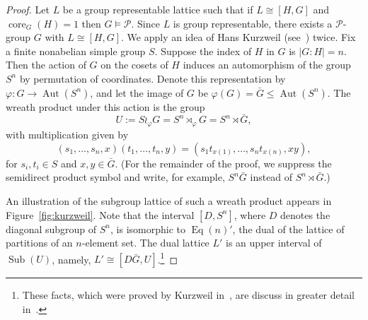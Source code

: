 \documentclass[11pt]{amsart}
\theoremstyle{plain}
\theoremstyle{definition}
\theoremstyle{remark}
\numberwithin{theorem}{section}
\numberwithin{claim}{section}
\numberwithin{equation}{section}
\numberwithin{conjecture}{section}
\newcommand{\<}{\ensuremath{\langle}}
\renewcommand{\>}{\ensuremath{\rangle}}
\renewcommand{\leq}{\ensuremath{\leqslant}}
\newcommand{\Aut}{\ensuremath{\operatorname{Aut}}}
\newcommand{\Eq}{\ensuremath{\operatorname{Eq}}}
\newcommand{\Sub}{\ensuremath{\operatorname{Sub}}}
\newcommand{\core}{\ensuremath{\operatorname{core}}}
\newcommand{\0}{\ensuremath{\mathbf{0}}}
\newcommand{\1}{\ensuremath{\mathbf{1}}}
\newcommand{\2}{\ensuremath{\mathbf{2}}}
\newcommand{\3}{\ensuremath{\mathbf{3}}}
\newcommand{\4}{\ensuremath{\mathbf{4}}}
\newcommand{\5}{\ensuremath{\mathbf{5}}}
\newcommand{\cP}{\ensuremath{\mathcal{P}}}
\renewcommand{\phi}{\ensuremath{\varphi}}
\begin{document}
\begin{proof}
  Let $L$ be a group representable lattice such that if $L\cong [H,G]$ and
  $\core_G(H)=1$ then $G\vDash \cP$.
  Since $L$ is group representable, there exists a $\cP$-group $G$ with $L
  \cong [H,G]$. 
  We apply an idea of Hans Kurzweil (see~\cite{Kurzweil:1985}) twice.
Fix a finite nonabelian simple
  group $S$. Suppose the index of $H$ in $G$ is $|G:H| = n$.
  Then the action of $G$ on the cosets of $H$ induces an automorphism of the
  group $S^n$ by permutation of coordinates.  Denote this representation by
  $\phi: G \rightarrow \Aut(S^n)$, 
  and let the image of $G$ be $\phi(G) =
  \bar{G} \leq \Aut(S^n)$.  
  The wreath product under this action is the group
  \[
  U:= S\wr_\phi G = S^n \rtimes_\phi G = S^n \rtimes \bar{G}, %
  \]
  with multiplication given by
  \[
  (s_1, \dots, s_n, x) (t_1, \dots, t_n, y) = 
  (s_1 t_{x(1)}, \dots, s_nt_{x(n)}, x y),
  \]
  for $s_i, t_i \in S$ and $x, y \in \bar{G}$.  (For the remainder of the proof,
  we suppress the semidirect product symbol and write, for example, $S^n\bar{G}$
  instead of $S^n \rtimes \bar{G}$.)

  An illustration of the subgroup lattice of such a wreath product appears in
  Figure~\ref{fig:kurzweil}.  Note that the interval
  $[D, S^n]$, where $D$ denotes the diagonal subgroup of
  $S^n$, is isomorphic to $\Eq(n)'$, the dual of the lattice of partitions of an
  $n$-element set.
  The dual lattice $L'$ is an upper interval of $\Sub(U)$, namely,
  $L'\cong [D\bar{G}, U]$.\footnote{These facts, which were proved by Kurzweil
    in~\cite{Kurzweil:1985}, are discuss in greater detail in~\cite[Section 2.2]{DeMeo:thesis}.} 


\end{proof}
\end{document}
